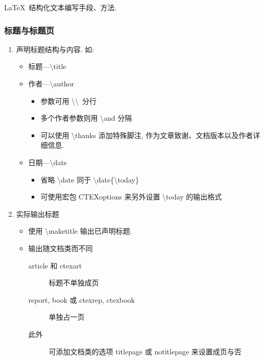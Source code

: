 \documentclass[UTF8]{ctexart}
\begin{document}
        \LaTeX\ 结构化文本编写手段、方法.

        \subsubsection{标题与标题页}

            \begin{enumerate}

                \item 声明标题结构与内容. 如: 
                \begin{itemize}
                    \item 标题---\textbackslash title
                    \item 作者---\textbackslash author
                    \begin{itemize}
                        \item 参数可用 \textbackslash\textbackslash\ 分行
                        \item 多个作者参数则用 \textbackslash and 分隔
                        \item 可以使用 \textbackslash thanks 添加特殊脚注, 作为文章致谢、文档版本以及作者详细信息. 
                    \end{itemize}
                    \item 日期---\textbackslash date
                    \begin{itemize}
                        \item 省略 \textbackslash date 同于 \textbackslash date\{\textbackslash today\}
                        \item 可使用宏包 CTEXoptions 来另外设置 \textbackslash today 的输出格式
                    \end{itemize}
                \end{itemize}

                \item 实际输出标题
                \begin{itemize}
                    \item 使用 \textbackslash maketitle 输出已声明标题.
                    \item 输出随文档类而不同
                    \begin{description}
                        \item[article 和 ctexart] 标题不单独成页
                        \item[report, book 或 ctexrep, ctexbook] 单独占一页 
                        \item[此外] 可添加文档类的选项 titlepage 或 notitlepage 来设置成页与否
                    \end{description}
                \end{itemize}


\end{enumerate}
\end{document}
